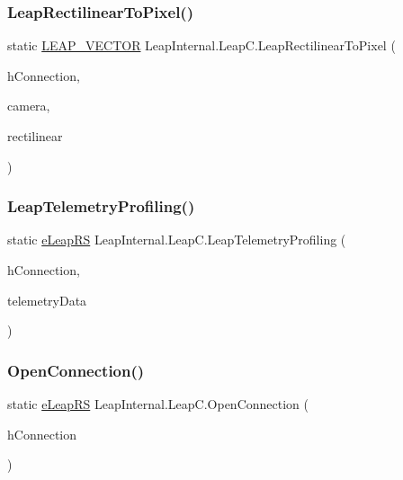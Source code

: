 \subsubsection{\texorpdfstring{LeapRectilinearToPixel()}{LeapRectilinearToPixel()}}
{\footnotesize\ttfamily static \mbox{\hyperlink{struct_leap_internal_1_1_l_e_a_p___v_e_c_t_o_r}{L\+E\+A\+P\+\_\+\+V\+E\+C\+T\+OR}} Leap\+Internal.\+Leap\+C.\+Leap\+Rectilinear\+To\+Pixel (\begin{DoxyParamCaption}\item[{Int\+Ptr}]{h\+Connection,  }\item[{\mbox{\hyperlink{namespace_leap_internal_af2a2bc35637b8a453ff772a09a0987a1}{e\+Leap\+Perspective\+Type}}}]{camera,  }\item[{\mbox{\hyperlink{struct_leap_internal_1_1_l_e_a_p___v_e_c_t_o_r}{L\+E\+A\+P\+\_\+\+V\+E\+C\+T\+OR}}}]{rectilinear }\end{DoxyParamCaption})}

\mbox{\label{class_leap_internal_1_1_leap_c_a8c04b0435063d992e7fba8815547fa5e}} 
\subsubsection{\texorpdfstring{LeapTelemetryProfiling()}{LeapTelemetryProfiling()}}
{\footnotesize\ttfamily static \mbox{\hyperlink{namespace_leap_internal_ae50b07d24c508b84273392b6dcbea1d9}{e\+Leap\+RS}} Leap\+Internal.\+Leap\+C.\+Leap\+Telemetry\+Profiling (\begin{DoxyParamCaption}\item[{Int\+Ptr}]{h\+Connection,  }\item[{ref \mbox{\hyperlink{struct_leap_internal_1_1_l_e_a_p___t_e_l_e_m_e_t_r_y___d_a_t_a}{L\+E\+A\+P\+\_\+\+T\+E\+L\+E\+M\+E\+T\+R\+Y\+\_\+\+D\+A\+TA}}}]{telemetry\+Data }\end{DoxyParamCaption})}

\mbox{\label{class_leap_internal_1_1_leap_c_a18543f45477c803f6858299f5b942f5a}} 
\subsubsection{\texorpdfstring{OpenConnection()}{OpenConnection()}}
{\footnotesize\ttfamily static \mbox{\hyperlink{namespace_leap_internal_ae50b07d24c508b84273392b6dcbea1d9}{e\+Leap\+RS}} Leap\+Internal.\+Leap\+C.\+Open\+Connection (\begin{DoxyParamCaption}\item[{Int\+Ptr}]{h\+Connection }\end{DoxyParamCaption})}

